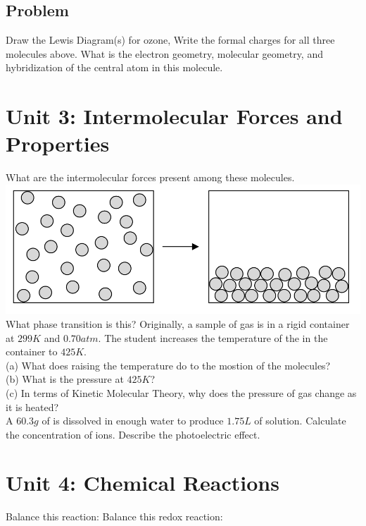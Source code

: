 \documentclass{article}
\begin{document}
\subsection*{Problem \countThis}
Draw the Lewis Diagram(s) for ozone, 
\ProblemSet
Write the formal charges for all three molecules above.
\ProblemSet
What is the electron geometry, molecular geometry, and hybridization of the central atom in this molecule. \\ 
\section{Unit 3: Intermolecular Forces and Properties}
\ProblemSet
What are the intermolecular forces present among these molecules. \\ 
\ProblemSet
\includegraphics[scale = 0.5]{photo3.png}
What phase transition is this?
\ProblemSet
Originally, a sample of gas is in a rigid container at \(299K\) and \(0.70 atm\). The student increases the temperature of the  in the container to \(425K\).\\
(a) What does raising the temperature do to the mostion of the molecules?\\
(b) What is the pressure at \(425K\)?\\
(c) In terms of Kinetic Molecular Theory, why does the pressure of gas change as it is heated? \\
\ProblemSet
A \(60.3g\) of  is dissolved in enough water to produce \(1.75L\) of solution. Calculate the concentration of  ions. 
\ProblemSet
Describe the photoelectric effect. 
\section{Unit 4: Chemical Reactions}
Balance this reaction:
\ProblemSet
Balance this redox reaction: 
\end{document}
